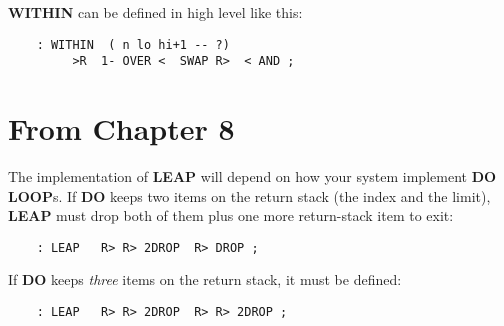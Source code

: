 {\bf WITHIN} can be defined in high level like this:
\begin{verbatim}
    : WITHIN  ( n lo hi+1 -- ?)
         >R  1- OVER <  SWAP R>  < AND ;
\end{verbatim}
\section{From Chapter 8}
The implementation of {\bf LEAP} will depend on how your system 
implement {\bf DO LOOP}s.  If {\bf DO} keeps two items on the return stack (the
index and the limit), {\bf LEAP} must drop both of them plus one more
return-stack item to exit:
\begin{verbatim}
    : LEAP   R> R> 2DROP  R> DROP ;
\end{verbatim}
If {\bf DO} keeps \emph{three} items on the return stack, it must be defined: 
\begin{verbatim}
    : LEAP   R> R> 2DROP  R> R> 2DROP ;
\end{verbatim}

